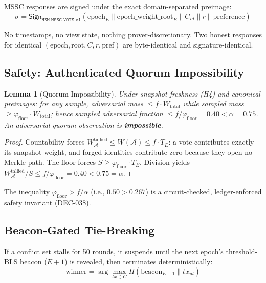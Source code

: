 \documentclass[11pt, a4paper]{article}
\newtheorem{lemma}[theorem]{Lemma}
\begin{document}
MSSC responses are signed under the exact domain-separated preimage:
\begin{equation}
\sigma = \mathsf{Sign}_{\texttt{HSM\_MSSC\_VOTE\_v1}}(\text{epoch}_E \| \text{epoch\_weight\_root}_E \| C_{id} \| r \| \text{preference})
\end{equation}

No timestamps, no view state, nothing prover-discretionary. Two honest responses for identical $(\text{epoch}, \text{root}, C, r, \text{pref})$ are byte-identical and signature-identical.

\subsection{Safety: Authenticated Quorum Impossibility}

\begin{lemma}[Quorum Impossibility]
Under snapshot freshness (H4) and canonical preimages: for any sample, adversarial mass $\le f \cdot W_{\text{total}}$ while sampled mass $\ge \varphi_{\text{floor}} \cdot W_{\text{total}}$; hence sampled adversarial fraction $\le f/\varphi_{\text{floor}} = 0.40 < \alpha = 0.75$. An adversarial quorum observation is \textbf{impossible}.
\end{lemma}
\begin{proof}
Countability forces $W_{\mathcal{A}}^{\text{tallied}} \le W(\mathcal{A}) \le f \cdot T_E$: a vote contributes exactly its snapshot weight, and forged identities contribute zero because they open no Merkle path. The floor forces $S \ge \varphi_{\text{floor}} \cdot T_E$. Division yields $W_{\mathcal{A}}^{\text{tallied}}/S \le f/\varphi_{\text{floor}} = 0.40 < 0.75 = \alpha$.
\end{proof}

The inequality $\varphi_{\text{floor}} > f/\alpha$ (i.e., $0.50 > 0.267$) is a circuit-checked, ledger-enforced safety invariant (DEC-038).

\subsection{Beacon-Gated Tie-Breaking}

If a conflict set stalls for 50 rounds, it suspends until the next epoch's threshold-BLS beacon ($E+1$) is revealed, then terminates deterministically:
\begin{equation}
\text{winner} = \arg\max_{tx \in C} H(\text{beacon}_{E+1} \| tx_{id})
\end{equation}
\end{document}
